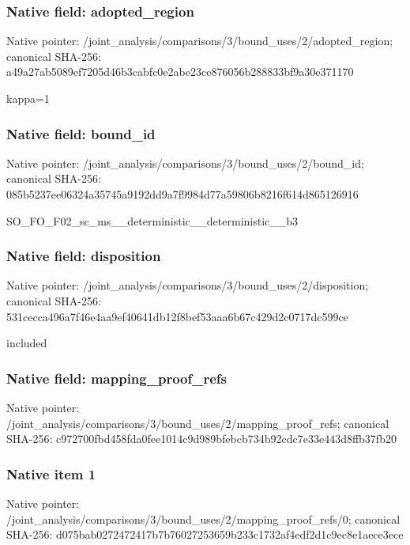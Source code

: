 \documentclass[10pt,a4paper]{article}
\begin{document}
\subsubsection{Native field: adopted\_\allowbreak{}region}
Native pointer: /joint\_\allowbreak{}analysis/comparisons/3/bound\_\allowbreak{}uses/2/adopted\_\allowbreak{}region; canonical SHA-256: a49a27ab5089ef7205d46b3cabfc0e2abe23ce876056b288833bf9a30e371170

\begingroup\raggedright\sloppy kappa=\allowbreak{}1\par\endgroup

\subsubsection{Native field: bound\_\allowbreak{}id}
Native pointer: /joint\_\allowbreak{}analysis/comparisons/3/bound\_\allowbreak{}uses/2/bound\_\allowbreak{}id; canonical SHA-256: 085b5237ee06324a35745a9192dd9a7f9984d77a59806b8216f614d865126916

\begingroup\raggedright\sloppy SO\_\allowbreak{}FO\_\allowbreak{}F02\_\allowbreak{}sc\_\allowbreak{}ms\_\allowbreak{}\_\allowbreak{}deterministic\_\allowbreak{}\_\allowbreak{}deterministic\_\allowbreak{}\_\allowbreak{}b3\par\endgroup

\subsubsection{Native field: disposition}
Native pointer: /joint\_\allowbreak{}analysis/comparisons/3/bound\_\allowbreak{}uses/2/disposition; canonical SHA-256: 531cecca496a7f46e4aa9ef40641db12f8bef53aaa6b67c429d2c0717dc599ce

\begingroup\raggedright\sloppy included\par\endgroup

\subsubsection{Native field: mapping\_\allowbreak{}proof\_\allowbreak{}refs}
Native pointer: /joint\_\allowbreak{}analysis/comparisons/3/bound\_\allowbreak{}uses/2/mapping\_\allowbreak{}proof\_\allowbreak{}refs; canonical SHA-256: c972700fbd458fda0fee1014c9d989bfebcb734b92cdc7e33e443d8ffb37fb20

\subsubsection{Native item 1}
Native pointer: /joint\_\allowbreak{}analysis/comparisons/3/bound\_\allowbreak{}uses/2/mapping\_\allowbreak{}proof\_\allowbreak{}refs/0; canonical SHA-256: d075bab0272472417b7b76027253659b233c1732af4edf2d1c9ec8e1aece3ece
\end{document}

